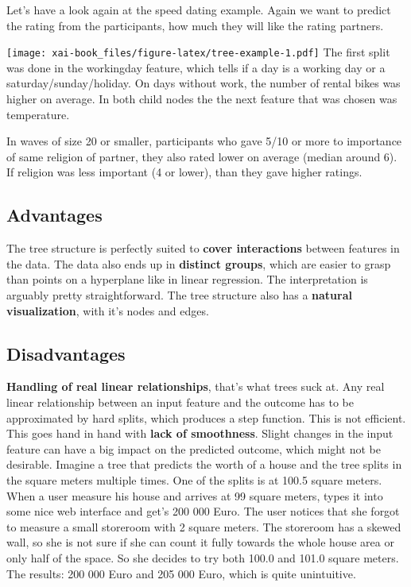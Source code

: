 \documentclass[12pt,]{krantz}
\theoremstyle{definition}
\theoremstyle{definition}
\theoremstyle{definition}
\theoremstyle{remark}
\begin{document}
Let's have a look again at the speed dating example. Again we want to
predict the rating from the participants, how much they will like the
rating partners.

\texttt{[image: xai-book\_files/figure-latex/tree-example-1.pdf]} The
first split was done in the workingday feature, which tells if a day is
a working day or a saturday/sunday/holiday. On days without work, the
number of rental bikes was higher on average. In both child nodes the
the next feature that was chosen was temperature.

In waves of size 20 or smaller, participants who gave 5/10 or more to
importance of same religion of partner, they also rated lower on average
(median around 6). If religion was less important (4 or lower), than
they gave higher ratings.

\subsection{Advantages}\label{advantages}

The tree structure is perfectly suited to \textbf{cover interactions}
between features in the data. The data also ends up in \textbf{distinct
groups}, which are easier to grasp than points on a hyperplane like in
linear regression. The interpretation is arguably pretty
straightforward. The tree structure also has a \textbf{natural
visualization}, with it's nodes and edges.

\subsection{Disadvantages}\label{disadvantages}

\textbf{Handling of real linear relationships}, that's what trees suck
at. Any real linear relationship between an input feature and the
outcome has to be approximated by hard splits, which produces a step
function. This is not efficient. This goes hand in hand with
\textbf{lack of smoothness}. Slight changes in the input feature can
have a big impact on the predicted outcome, which might not be
desirable. Imagine a tree that predicts the worth of a house and the
tree splits in the square meters multiple times. One of the splits is at
100.5 square meters. When a user measure his house and arrives at 99
square meters, types it into some nice web interface and get's 200 000
Euro. The user notices that she forgot to measure a small storeroom with
2 square meters. The storeroom has a skewed wall, so she is not sure if
she can count it fully towards the whole house area or only half of the
space. So she decides to try both 100.0 and 101.0 square meters. The
results: 200 000 Euro and 205 000 Euro, which is quite unintuitive.
\end{document}
